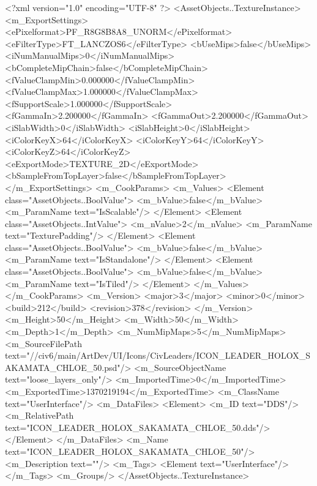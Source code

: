 <?xml version="1.0" encoding="UTF-8" ?>
<AssetObjects..TextureInstance>
	<m_ExportSettings>
		<ePixelformat>PF_R8G8B8A8_UNORM</ePixelformat>
		<eFilterType>FT_LANCZOS6</eFilterType>
		<bUseMips>false</bUseMips>
		<iNumManualMips>0</iNumManualMips>
		<bCompleteMipChain>false</bCompleteMipChain>
		<fValueClampMin>0.000000</fValueClampMin>
		<fValueClampMax>1.000000</fValueClampMax>
		<fSupportScale>1.000000</fSupportScale>
		<fGammaIn>2.200000</fGammaIn>
		<fGammaOut>2.200000</fGammaOut>
		<iSlabWidth>0</iSlabWidth>
		<iSlabHeight>0</iSlabHeight>
		<iColorKeyX>64</iColorKeyX>
		<iColorKeyY>64</iColorKeyY>
		<iColorKeyZ>64</iColorKeyZ>
		<eExportMode>TEXTURE_2D</eExportMode>
		<bSampleFromTopLayer>false</bSampleFromTopLayer>
	</m_ExportSettings>
	<m_CookParams>
		<m_Values>
			<Element class="AssetObjects..BoolValue">
				<m_bValue>false</m_bValue>
				<m_ParamName text="IsScalable"/>
			</Element>
			<Element class="AssetObjects..IntValue">
				<m_nValue>2</m_nValue>
				<m_ParamName text="TexturePadding"/>
			</Element>
			<Element class="AssetObjects..BoolValue">
				<m_bValue>false</m_bValue>
				<m_ParamName text="IsStandalone"/>
			</Element>
			<Element class="AssetObjects..BoolValue">
				<m_bValue>false</m_bValue>
				<m_ParamName text="IsTiled"/>
			</Element>
		</m_Values>
	</m_CookParams>
	<m_Version>
		<major>3</major>
		<minor>0</minor>
		<build>212</build>
		<revision>378</revision>
	</m_Version>
	<m_Height>50</m_Height>
	<m_Width>50</m_Width>
	<m_Depth>1</m_Depth>
	<m_NumMipMaps>5</m_NumMipMaps>
	<m_SourceFilePath text="//civ6/main/ArtDev/UI/Icons/CivLeaders/ICON_LEADER_HOLOX_SAKAMATA_CHLOE_50.psd"/>
	<m_SourceObjectName text="loose_layers_only"/>
	<m_ImportedTime>0</m_ImportedTime>
	<m_ExportedTime>1370219194</m_ExportedTime>
	<m_ClassName text="UserInterface"/>
	<m_DataFiles>
		<Element>
			<m_ID text="DDS"/>
			<m_RelativePath text="ICON_LEADER_HOLOX_SAKAMATA_CHLOE_50.dds"/>
		</Element>
	</m_DataFiles>
	<m_Name text="ICON_LEADER_HOLOX_SAKAMATA_CHLOE_50"/>
	<m_Description text=""/>
	<m_Tags>
		<Element text="UserInterface"/>
	</m_Tags>
	<m_Groups/>
</AssetObjects..TextureInstance>

